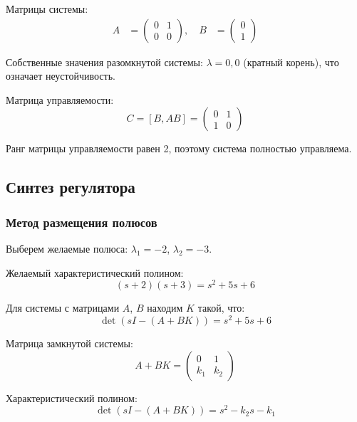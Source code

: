Матрицы системы:
\begin{align}
A &= \begin{pmatrix} 0 & 1 \\ 0 & 0 \end{pmatrix}, \quad
B &= \begin{pmatrix} 0 \\ 1 \end{pmatrix}
\end{align}

Собственные значения разомкнутой системы: $\lambda = 0, 0$ (кратный корень), что означает неустойчивость.

Матрица управляемости:
\begin{equation}
C = [B, AB] = \begin{pmatrix} 0 & 1 \\ 1 & 0 \end{pmatrix}
\end{equation}

Ранг матрицы управляемости равен 2, поэтому система полностью управляема.

\subsection*{Синтез регулятора}

\subsubsection*{Метод размещения полюсов}

Выберем желаемые полюса: $\lambda_1 = -2$, $\lambda_2 = -3$.

Желаемый характеристический полином:
\begin{equation}
(s + 2)(s + 3) = s^2 + 5s + 6
\end{equation}

Для системы с матрицами $A$, $B$ находим $K$ такой, что:
\begin{equation}
\det(sI - (A + BK)) = s^2 + 5s + 6
\end{equation}

Матрица замкнутой системы:
\begin{equation}
A + BK = \begin{pmatrix} 0 & 1 \\ k_1 & k_2 \end{pmatrix}
\end{equation}

Характеристический полином:
\begin{equation}
\det(sI - (A + BK)) = s^2 - k_2s - k_1
\end{equation}

